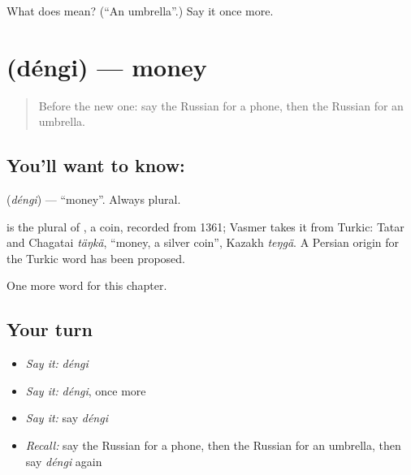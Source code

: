 \begin{tcolorbox}[breakable,colback=teal!4,colframe=teal!35!black,title={Before you move on}]
What does  mean? (\textquotedblleft{}An umbrella\textquotedblright{}.) Say it once more.
\end{tcolorbox}
\section[\texorpdfstring{\ru{деньги} (déngi)}{деньги (déngi)}]{ (déngi) — money}

\label{lesson:RU-C53-money}



\begin{quote}
Before the new one: say the Russian for a phone, then the Russian for an umbrella.
\end{quote}

\subsection*{You'll want to know: }
\textbf{} (\emph{déngi}) — \textquotedblleft{}money\textquotedblright{}. Always plural.

\begin{cousinweb}
\textbf{} is the plural of \emph{}, a coin, recorded from 1361; Vasmer takes it from Turkic: Tatar and Chagatai \emph{täŋkä}, \textquotedblleft{}money, a silver coin\textquotedblright{}, Kazakh \emph{teŋgä}. A Persian origin for the Turkic word has been proposed.
\end{cousinweb}

\begin{grammarlens}[title={What you've built}]
One more word for this chapter.
\end{grammarlens}

\subsection*{Your turn}
\begin{itemize}
\raggedright
  \item \emph{Say it:} \emph{déngi}
  \item \emph{Say it:} \emph{déngi}, once more
  \item \emph{Say it:} say \emph{déngi}
  \item \emph{Recall:} say the Russian for a phone, then the Russian for an umbrella, then say \emph{déngi} again
\end{itemize}

